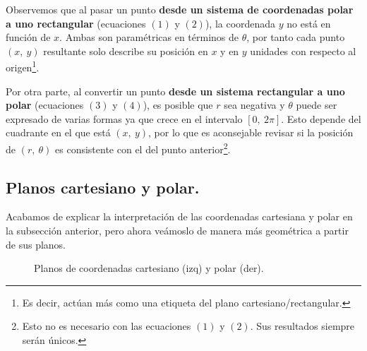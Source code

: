\documentclass[12pt]{article}
\begin{document}
Observemos que al pasar un punto \textbf{desde un sistema de coordenadas polar a uno rectangular} (ecuaciones $(1)$ y $(2)$), la coordenada $y$ no está en función de $x$. Ambas son paramétricas en términos de $\theta$, por tanto cada punto $(x, \ y)$ resultante solo describe su posición en $x$ y en $y$ unidades con respecto al origen\footnote{Es decir, actúan más como una etiqueta del plano cartesiano/rectangular.}.

Por otra parte, al convertir un punto \textbf{desde un sistema rectangular a uno polar} (ecuaciones $(3)$ y $(4)$), es posible que $r$ sea negativa y $\theta$ puede ser expresado de varias formas ya que crece en el intervalo $[0, \ 2\pi]$. Esto depende del cuadrante en el que está $(x, \ y)$, por lo que es aconsejable revisar si la posición de $(r, \ \theta)$ es consistente con el del punto anterior\footnote{Esto no es necesario con las ecuaciones $(1)$ y $(2)$. Sus resultados siempre serán únicos.}.

\subsection{Planos cartesiano y polar.}

Acabamos de explicar la interpretación de las coordenadas cartesiana y polar en la subsección anterior, pero ahora veámoslo de manera más geométrica a partir de sus planos.

\begin{figure}[hbt!]

\centering


\caption{Planos de coordenadas cartesiano (izq) y polar (der).}

\end{figure}
\end{document}
